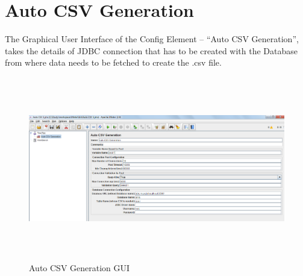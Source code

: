 \documentclass[12pt]{book}
\begin{document}
\section{Auto CSV Generation}
The Graphical User Interface of the Config Element – “Auto CSV Generation”, takes the details of JDBC connection that has to be created 
with the Database from where data needs to be fetched to create the .csv file.
  \begin{figure}[H]
   \centering
   \includegraphics[width=14cm, height=8cm]{images/autocsvgeneration_1}
   \caption{Auto CSV Generation GUI\label{fig:fig15_JMeter}}
  \end{figure}
 
\end{document}
